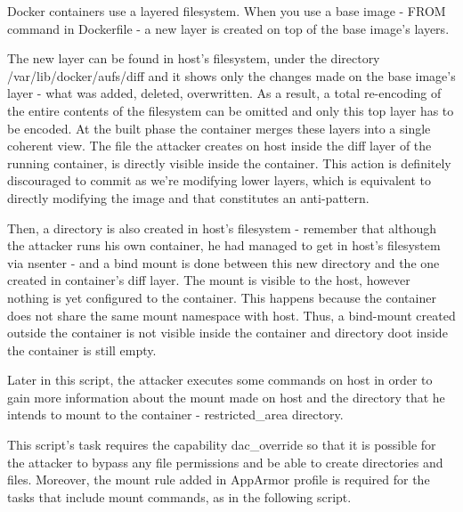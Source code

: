 Docker containers use a layered filesystem. When you use a base image - FROM command in Dockerfile - a new layer is created on top of the base image's layers.

The new layer can be found in host's filesystem, under the directory /var/lib/docker/aufs/diff and it shows only the changes made on the base image's layer - what was added, deleted, overwritten. As a result, a total re-encoding of the entire contents of the filesystem can be omitted and only this top layer has to be encoded. At the built phase the container merges these layers into a single coherent view. The file the attacker creates on host inside the diff layer of the running container, is directly visible inside the container. This action is definitely discouraged to commit as we're modifying lower layers, which is equivalent to directly modifying the image and that constitutes an anti-pattern.

Then, a directory is also created in host's filesystem - remember that although the attacker runs his own container, he had managed to get in host's filesystem via nsenter - and a bind mount is done between this new directory and the one created in container's diff layer. The mount is visible to the host, however nothing is yet configured to the container. This happens because the container does not share the same mount namespace with host. Thus, a bind-mount created outside the container is not visible inside the container and directory doot inside the container is still empty.

Later in this script, the attacker executes some commands on host in order to gain more information about the mount made on host and the directory that he intends to mount to the container - restricted\_area directory.

This script's task requires the capability dac\_override so that it is possible for the attacker to bypass any file permissions and be able to create directories and files. Moreover, the mount rule added in AppArmor profile is required for the tasks that include mount commands, as in the following script.

